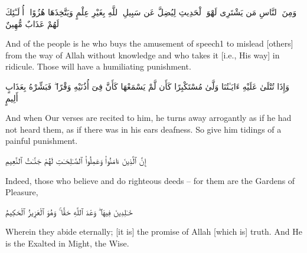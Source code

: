 \begin{edition*}
	\begin{Arabic}
		وَمِنَ ٱلنَّاسِ مَن يَشْتَرِى لَهْوَ ٱلْحَدِيثِ لِيُضِلَّ عَن سَبِيلِ ٱللَّهِ بِغَيْرِ عِلْمٍ وَيَتَّخِذَهَا هُزُوًا ۚ أُو۟لَـٰٓئِكَ لَهُمْ عَذَابٌ مُّهِينٌ
	\end{Arabic}
\end{edition*}

\begin{translation}
	And of the people is he who buys the amusement of speech1 to mislead [others] from the way of Allah without knowledge and who takes it [i.e., His way] in ridicule. Those will have a humiliating punishment.
\end{translation}


\begin{edition*}
	\begin{Arabic}
		وَإِذَا تُتْلَىٰ عَلَيْهِ ءَايَـٰتُنَا وَلَّىٰ مُسْتَكْبِرًا كَأَن لَّمْ يَسْمَعْهَا كَأَنَّ فِىٓ أُذُنَيْهِ وَقْرًا ۖ فَبَشِّرْهُ بِعَذَابٍ أَلِيمٍ
	\end{Arabic}
\end{edition*}

\begin{translation}
	And when Our verses are recited to him, he turns away arrogantly as if he had not heard them, as if there was in his ears deafness. So give him tidings of a painful punishment.
\end{translation}


\begin{edition*}
	\begin{Arabic}
		إِنَّ ٱلَّذِينَ ءَامَنُوا۟ وَعَمِلُوا۟ ٱلصَّـٰلِحَـٰتِ لَهُمْ جَنَّـٰتُ ٱلنَّعِيمِ
	\end{Arabic}
\end{edition*}

\begin{translation}
	Indeed, those who believe and do righteous deeds -- for them are the Gardens of Pleasure,
\end{translation}


\begin{edition*}
	\begin{Arabic}
		خَـٰلِدِينَ فِيهَا ۖ وَعْدَ ٱللَّهِ حَقًّا ۚ وَهُوَ ٱلْعَزِيزُ ٱلْحَكِيمُ
	\end{Arabic}
\end{edition*}

\begin{translation}
	Wherein they abide eternally; [it is] the promise of Allah [which is] truth. And He is the Exalted in Might, the Wise.
\end{translation}


